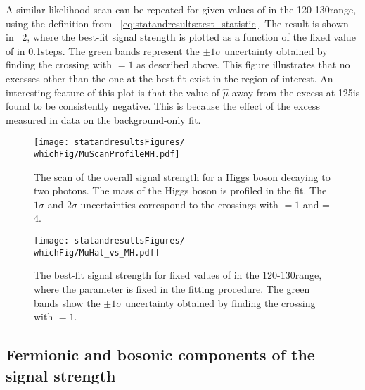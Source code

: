 A similar likelihood scan can be repeated for given values of \mH in the 120-130\GeV range, using the \DNLL definition from \Eq~\ref{eq:statandresults:test_statistic}.
The result is shown in \Fig~\ref{fig:statandresults:mu_vs_mh}, where the best-fit signal strength is plotted as a function of the fixed value of \mH in 0.1\GeV steps. The green bands represent the $\pm 1 \sigma$ uncertainty obtained by finding the crossing with \DNLL$=1$ as described above. This figure illustrates that no excesses other than the one at the best-fit exist in the region of interest. An interesting feature of this plot is that the value of $\hat{\mu}$ away from the excess at 125\GeV is found to be consistently negative. This is because the effect of the excess measured in data on the background-only fit.

\begin{figure}[ht!]
\centering
\texttt{[image: statandresultsFigures/\\whichFig/MuScanProfileMH.pdf]} 
\caption{The \DNLL scan of the overall signal strength for a Higgs boson decaying to two photons. The mass of the Higgs boson is profiled in the fit. The $1\sigma$ and $2\sigma$ uncertainties correspond to the crossings with \DNLL$=1$ and \DNLL=$4$.}

\label{fig:statandresults:global_mu}
\end{figure}


\begin{figure}[ht!]
\centering
\texttt{[image: statandresultsFigures/\\whichFig/MuHat\_vs\_MH.pdf]} 
\caption{The best-fit signal strength for fixed values of \mH in the 120-130\GeV range, where the \mH parameter is fixed in the fitting procedure. The green bands show the $\pm 1 \sigma$ uncertainty obtained by finding the crossing with \DNLL$=1$. }

\label{fig:statandresults:mu_vs_mh}
\end{figure}

\subsection{Fermionic and bosonic components of the signal strength}
\label{sec:statandresults:rvrf}


